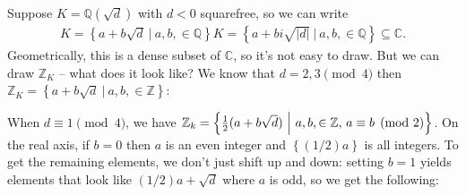 \begin{remark}

Suppose \(K = {\mathbb{Q}}( \sqrt{d} )\) with \(d<0\) squarefree, so we
can write
\begin{align*}
K = \left\{{ a + b \sqrt{d} {~\mathrel{\Big|}~}a,b, \in {\mathbb{Q}}}\right\}
K = \left\{{ a + b i\sqrt{{\left\lvert {d} \right\rvert}} {~\mathrel{\Big|}~}a,b, \in {\mathbb{Q}}}\right\} \subseteq {\mathbb{C}}
.\end{align*}
Geometrically, this is a dense subset of \({\mathbb{C}}\), so it's not
easy to draw. But we can draw \({\mathbb{Z}}_K\) -- what does it look
like? We know that \(d=2,3 \pmod 4\) then
\({\mathbb{Z}}_K = \left\{{a + b \sqrt{d} {~\mathrel{\Big|}~}a,b,\in {\mathbb{Z}}}\right\}\):

\begin{figure}
\centering
{}
\end{figure}

When \(d \equiv 1 \pmod 4\), we have
\({\mathbb{Z}}_k = \left\{{ {1\over 2}(a + b \sqrt{d} ) {~\mathrel{\Big|}~}a,b,\in {\mathbb{Z}},\, a\equiv b \pmod 2}\right\}\).
On the real axis, if \(b=0\) then \(a\) is an even integer and
\(\left\{{(1/2)a}\right\}\) is all integers. To get the remaining
elements, we don't just shift up and down: setting \(b=1\) yields
elements that look like \((1/2)a + \sqrt{d}\) where \(a\) is odd, so we
get the following:


\end{remark}

